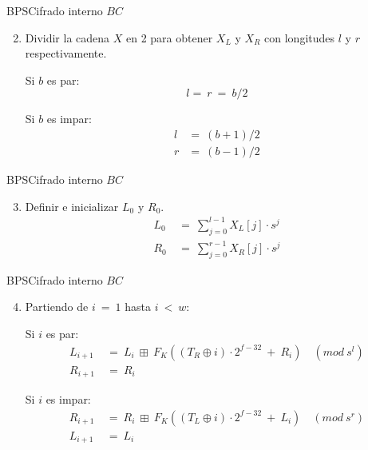 \begin{frame}{BPS}{Cifrado interno $BC$}

  \begin{enumerate}
    \setcounter{enumi}{1}
    \item Dividir la cadena $X$ en 2 para obtener $X_L$ y $X_R$ con
      longitudes $l$ y $r$ respectivamente.

      Si $b$ es par:
      \begin{equation*}
        l =\: r\: =\: b/2
      \end{equation*}

      Si $b$ es impar:
      \begin{align*}
        l &=\: (b+1)/2 \\
        r &=\: (b-1)/2
      \end{align*}
  \end{enumerate}

\end{frame}

\begin{frame}{BPS}{Cifrado interno $BC$}

  \begin{enumerate}
    \setcounter{enumi}{2}
    \item Definir e inicializar $L_0$ y $R_0$.
      \begin{align*}
        L_0\: &=\: \sum_{j=0}^{l-1} X_L[j] \cdot s^j \\
        R_0\: &=\: \sum_{j=0}^{r-1} X_R[j] \cdot s^j
      \end{align*}
  \end{enumerate}

\end{frame}

\begin{frame}{BPS}{Cifrado interno $BC$}

  \begin{enumerate}
    \setcounter{enumi}{3}
    \item Partiendo de $i\: =\: 1$ hasta $i\: <\: w$:

      Si $i$ es par:
      \begin{align*}
        L_{i+1}\: &=\: L_i\: \boxplus\:
                      F_K((T_R \oplus i) \cdot 2^{f-32}\: +\: R_i)\quad
                      (mod\ s^l) \\
        R_{i+1}\: &=\: R_i
      \end{align*}

      Si $i$ es impar:
      \begin{align*}
        R_{i+1}\: &=\: R_i\: \boxplus\:
                      F_K((T_L \oplus i) \cdot 2^{f-32}\: +\: L_i)\quad
                      (mod\ s^r) \\
        L_{i+1}\: &=\: L_i
      \end{align*}
  \end{enumerate}

\end{frame}

